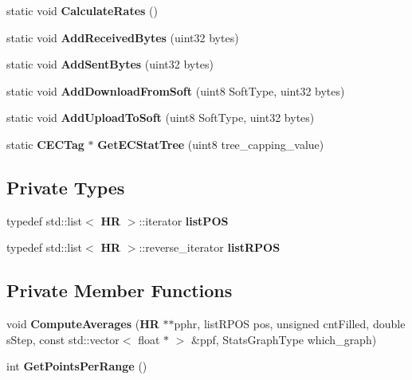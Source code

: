 \begin{DoxyCompactItemize}
\item 
static void {\bfseries CalculateRates} ()\label{classCStatistics_aa7f8d61a6af19d12c23b93586f4c9257}

\item 
static void {\bfseries AddReceivedBytes} (uint32 bytes)\label{classCStatistics_afd2950a7badb20f1e54b93a6e25d66eb}

\item 
static void {\bfseries AddSentBytes} (uint32 bytes)\label{classCStatistics_a3be47fb9d7d1503a9b71c718008518d2}

\item 
static void {\bfseries AddDownloadFromSoft} (uint8 SoftType, uint32 bytes)\label{classCStatistics_ae0f67ccfa07fb6422dfa3b92c9686efe}

\item 
static void {\bfseries AddUploadToSoft} (uint8 SoftType, uint32 bytes)\label{classCStatistics_abf21aed4fa28c8b79023fd4d6975db40}

\item 
static {\bf CECTag} $\ast$ {\bfseries GetECStatTree} (uint8 tree\_\-capping\_\-value)\label{classCStatistics_a4dbaace7dc282818eb74fa48e4e7007e}

\end{DoxyCompactItemize}
\subsection*{Private Types}
\begin{DoxyCompactItemize}
\item 
typedef std::list$<$ {\bf HR} $>$::iterator {\bfseries listPOS}\label{classCStatistics_a31a58dcc7fdcc363e4c3de6b4b89df6f}

\item 
typedef std::list$<$ {\bf HR} $>$::reverse\_\-iterator {\bfseries listRPOS}\label{classCStatistics_a05b87e40e6c0364a7f2eaeb6768af987}

\end{DoxyCompactItemize}
\subsection*{Private Member Functions}
\begin{DoxyCompactItemize}
\item 
void {\bfseries ComputeAverages} ({\bf HR} $\ast$$\ast$pphr, listRPOS pos, unsigned cntFilled, double sStep, const std::vector$<$ float $\ast$ $>$ \&ppf, StatsGraphType which\_\-graph)\label{classCStatistics_ad7223960c73b6848613ded60c1777601}

\item 
int {\bfseries GetPointsPerRange} ()\label{classCStatistics_ae76678a42dadc034de64584d70a314a8}

\end{DoxyCompactItemize}
